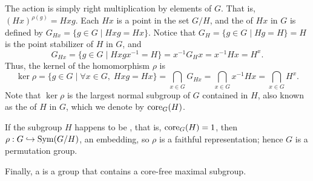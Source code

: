 The action is simply right multiplication by elements of $G$. That is,
$(Hx)^{\rho(g)}= Hxg$.
Each $Hx$ is a point in the set $G/H$, and the
 of $Hx$ in $G$ is defined by
$G_{Hx} = \{g\in G \mid Hxg = Hx \}$.  Notice that 
$G_H = \{g\in G \mid Hg = H \} = H$ is the point stabilizer of $H$ in $G$, and 
\[
G_{Hx} =\{g\in G \mid Hxgx^{-1}  = H \} = 
x^{-1} G_H x  = x^{-1} H x = H^x.
\]
Thus, the kernel of the homomorphism $\rho$ is 
\[
\ker \rho = \{g\in G \mid \forall x \in G,\; Hxg = Hx \} = 
\bigcap_{x\in G}G_{Hx} = \bigcap_{x\in G} x^{-1} H x  = \bigcap_{x\in G} H^x.
\]
Note that $\ker \rho$ is the largest normal subgroup of $G$ 
contained in $H$, also known as the  of $H$ in $G$, which we denote
by $\operatorname{core}_G(H)$.

If the subgroup $H$ happens to be , that is,
$\operatorname{core}_G(H)=1$, 
then $\rho : G \hookrightarrow \operatorname{Sym}(G/H)$, an embedding, so 
$\rho$ is a faithful representation; hence $G$ is a permutation group.

Finally, a  is a group that
contains a core-free maximal subgroup.





